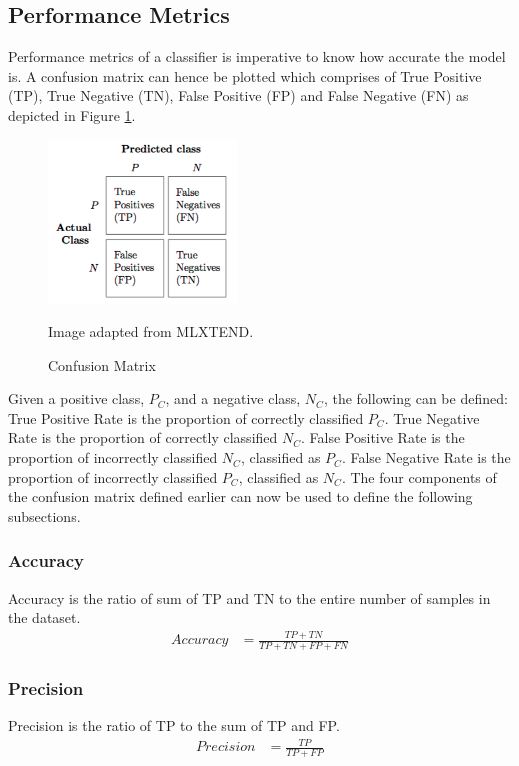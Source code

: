 \documentclass[a4paper,12pt,twoside]{report}
\begin{document}
\subsection{Performance Metrics}
Performance metrics of a classifier is imperative to know how accurate the model is. A confusion matrix can hence be plotted which comprises of True Positive (TP), True Negative (TN), False Positive (FP) and False Negative (FN) as depicted in Figure \ref{fig:confusion-matrix}.
\begin{figure}[h] %
    \centering
    \includegraphics[width=5cm]{confusion_matrix}
    \caption{Confusion Matrix}
    \small Image adapted from MLXTEND\footnotemark.
    \label{fig:confusion-matrix}
\end{figure}
\newline \newline
Given a positive class, $P_C$, and a negative class, $N_C$, the following can be defined: True Positive Rate is the proportion of correctly classified $P_C$. True Negative Rate is the proportion of correctly classified $N_C$. False Positive Rate is the proportion of incorrectly classified $N_C$, classified as $P_C$. False Negative Rate is the proportion of incorrectly classified $P_C$, classified as $N_C$. The four components of the confusion matrix defined earlier can now be used to define the following subsections.

\subsubsection{Accuracy} 
Accuracy is the ratio of sum of TP and TN to the entire number of samples in the dataset.
\begin{align*}
Accuracy &= \frac{ TP + TN}{TP + TN + FP + FN}
\end{align*}

\subsubsection{Precision} 
Precision is the ratio of TP to the sum of TP and FP.
\begin{align*}
Precision &= \frac{TP}{TP + FP}
\end{align*}
\end{document}
